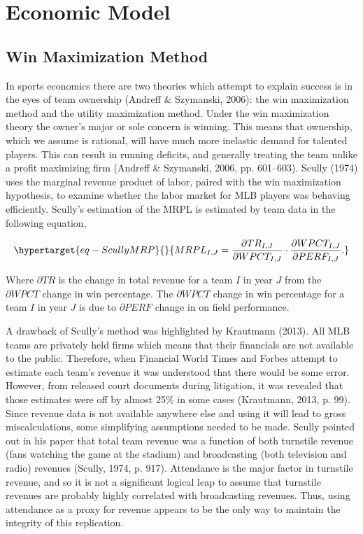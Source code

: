 \documentclass[
  12pt,
  letterpaper,
  DIV=11,
  numbers=noendperiod]{scrartcl}
\begin{document}
\hypertarget{sec-Method}{%
\section{Economic Model}\label{sec-Method}}

\hypertarget{sec-WinMethod}{%
\subsection{Win Maximization Method}\label{sec-WinMethod}}

In sports economics there are two theories which attempt to explain
success is in the eyes of team ownership (Andreff \& Szymanski, 2006):
the win maximization method and the utility maximization method. Under
the win maximization theory the owner's major or sole concern is
winning. This means that ownership, which we assume is rational, will
have much more inelastic demand for talented players. This can result in
running deficits, and generally treating the team unlike a profit
maximizing firm (Andreff \& Szymanski, 2006, pp. 601--603). Scully
(1974) uses the marginal revenue product of labor, paired with the win
maximization hypothesis, to examine whether the labor market for MLB
players was behaving efficiently. Scully's estimation of the MRPL is
estimated by team data in the following equation,

\begin{equation}\protect\hypertarget{eq-ScullyMRP}{}{
MRPL_{I,J}=\frac{\partial TR_{I,J}}{\partial WPCT_{I,J}}\cdot\frac{\partial WPCT_{I,J}}{\partial PERF_{I,J}}.
}\label{eq-ScullyMRP}\end{equation}

Where \(\partial TR\) is the change in total revenue for a team \(I\) in
year \(J\) from the \(\partial WPCT\) change in win percentage. The
\(\partial WPCT\) change in win percentage for a team \(I\) in year
\(J\) is due to \(\partial PERF\) change in on field performance.

A drawback of Scully's method was highlighted by Krautmann (2013). All
MLB teams are privately held firms which means that their financials are
not available to the public. Therefore, when Financial World Times and
Forbes attempt to estimate each team's revenue it was understood that
there would be some error. However, from released court documents during
litigation, it was revealed that those estimates were off by almost 25\%
in some cases (Krautmann, 2013, p. 99). Since revenue data is not
available anywhere else and using it will lead to gross miscalculations,
some simplifying assumptions needed to be made. Scully pointed out in
his paper that total team revenue was a function of both turnstile
revenue (fans watching the game at the stadium) and broadcasting (both
television and radio) revenues (Scully, 1974, p. 917). Attendance is the
major factor in turnstile revenue, and so it is not a significant
logical leap to assume that turnstile revenues are probably highly
correlated with broadcasting revenues. Thus, using attendance as a proxy
for revenue appears to be the only way to maintain the integrity of this
replication.
\end{document}
